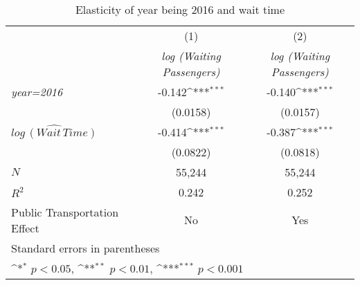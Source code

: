 \begin{table}[h]
\caption{Elasticity of year being 2016 and wait time}\label{tab:2016_regression}\\

{
\def\sym#1{\ifmmode^{#1}\else\(^{#1}\)\fi}
\begin{center}
\begin{tabular}{l*{2}{c}}
\hline\hline
            &\multicolumn{1}{c}{(1)}&\multicolumn{1}{c}{(2)}\\
            &\multicolumn{1}{c}{\textit{log (Waiting Passengers)}}&\multicolumn{1}{c}{\textit{log (Waiting Passengers)}}\\
\hline
\textit{year=2016}      &      -0.142\sym{***}&      -0.140\sym{***}\\
            &    (0.0158)         &    (0.0157)         \\
[1em]
${\widehat{log\, (Wait\, Time)}}$&      -0.414\sym{***} &     -0.387\sym{***}  \\
            &    (0.0822)         &    (0.0818)         \\
\hline
\(N\)       &       55,244         &       55,244         \\
\(R^{2}\)   &       0.242         &       0.252         \\
Public Transportation Effect &       No            &    Yes                 \\
\hline\hline
\multicolumn{3}{l}{\footnotesize Standard errors in parentheses}\\
\multicolumn{3}{l}{\footnotesize \sym{*} \(p<0.05\), \sym{**} \(p<0.01\), \sym{***} \(p<0.001\)}\\
\end{tabular}
\end{center}
}


\end{table}


